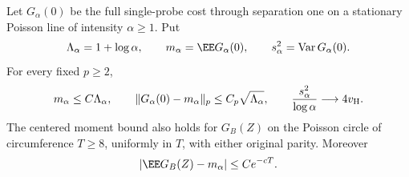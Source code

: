 \documentclass[11pt,letterpaper]{article}
\begin{document}
\begin{lemma}
\label{lem:Poisson-point-capture}
Let $G_\alpha(0)$ be the full single-probe cost through
separation one on a stationary Poisson line of intensity
$\alpha\ge1$. Put
\[
 \Lambda_\alpha=1+\log\alpha,\qquad
 m_\alpha=\EE G_\alpha(0),\qquad
 s_\alpha^2=\operatorname{Var}G_\alpha(0).
\]
For every fixed $p\ge2$,
\begin{equation}\label{eq:Poisson-point-capture-moments}
 m_\alpha\le C\Lambda_\alpha,\qquad
 \|G_\alpha(0)-m_\alpha\|_p\le C_p\sqrt{\Lambda_\alpha},
 \qquad
 \frac{s_\alpha^2}{\log\alpha}\longrightarrow4v_{\rm H}.
\end{equation}
The centered moment bound also holds for $G_B(Z)$ on the
Poisson circle of circumference $T\ge8$, uniformly in $T$,
with either original parity. Moreover
\begin{equation}\label{eq:Poisson-point-capture-mean-bias}
 |\EE G_B(Z)-m_\alpha|\le Ce^{-cT}.
\end{equation}
\end{lemma}
\end{document}
